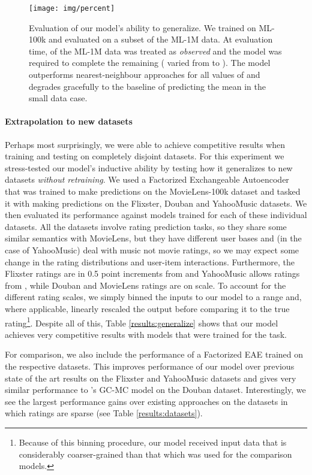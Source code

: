 \documentclass{article}
\theoremstyle{definition}
\begin{document}
\begin{figure}[h]\centering
\texttt{[image: img/percent]}
\caption{Evaluation of our model's ability to generalize. We trained on ML-100k and evaluated on a subset of the ML-1M data. At evaluation time,  of the ML-1M data was treated as \emph{observed} and the model was required to complete the remaining  ( varied from  to ). The model outperforms nearest-neighbour approaches for all values of  and degrades gracefully to the baseline of predicting the mean in the small data case.}
\label{fig:missing}
\end{figure}

\vspace{-.6em minus .3em}\paragraph{Extrapolation to new datasets}
Perhaps most surprisingly, we were able to achieve competitive results when training and testing on completely disjoint datasets. For this experiment we stress-tested our model's inductive ability by testing how it generalizes to new datasets \emph{without retraining}. We used a Factorized Exchangeable Autoencoder that was trained to make predictions on the MovieLens-100k dataset and tasked it with making predictions on the Flixster, Douban and YahooMusic datasets. We then evaluated its performance against models trained for each of these individual datasets. All the datasets involve rating prediction tasks, so they share some similar semantics with MovieLens, but they have different user bases and (in the case of YahooMusic) deal with music not movie ratings, so we may expect some change in the rating distributions and user-item interactions. Furthermore, the Flixster ratings are in 0.5 point increments from  and YahooMusic allows ratings from , while Douban and MovieLens ratings are on  scale. To account for the different rating scales, we simply binned the inputs to our model to a  range and, where applicable, linearly rescaled the output before comparing it to the true rating\footnote{Because of this binning procedure, our model received input data that is considerably coarser-grained than that which was used for the comparison models.}. Despite all of this, Table \ref{results:generalize} shows that our model achieves very competitive results with models that were trained for the task. 

For comparison, we also include the performance of a Factorized EAE trained on the respective datasets. This improves performance of our model over previous state of the art results on the Flixster and YahooMusic datasets and gives very similar performance to \citet{berg2017graph}'s GC-MC model on the Douban dataset. Interestingly, we see the largest performance gains over existing approaches on the datasets in which ratings are sparse (see Table \ref{results:datasets}).
\end{document}

